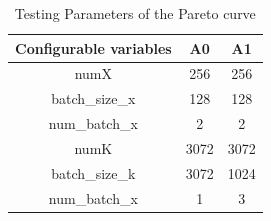\documentclass{sig-alternate}
\begin{document}
\begin{table}[h!]
     \centering
     \begin{tabular}{c|c|c}
        \hline
          Configurable variables& A0 & A1  \\
         \hline
         numX & 256 & 256 \\
         \hline
         batch\_size\_x & 128 & 128 \\
         \hline
         num\_batch\_x & 2 & 2 \\
          \hline
         numK & 3072 & 3072 \\  
         \hline
         batch\_size\_k & 3072 & 1024 \\
         \hline
         num\_batch\_x & 1 & 3 \\
         \hline
     \end{tabular}
     \caption{Testing Parameters of the Pareto curve}
     \label{tab-test-param}
 \end{table}
\end{document}
